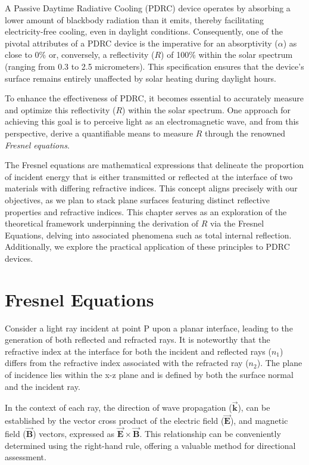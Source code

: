 A Passive Daytime Radiative Cooling (PDRC) device operates by absorbing a lower amount of blackbody radiation than it emits, thereby facilitating electricity-free cooling, even in daylight conditions. Consequently, one of the pivotal attributes of a PDRC device is the imperative for an absorptivity ($\alpha$) as close to 0\% or, conversely, a reflectivity ($R$) of 100\% within the solar spectrum (ranging from 0.3 to 2.5 micrometers). This specification ensures that the device's surface remains entirely unaffected by solar heating during daylight hours.

To enhance the effectiveness of PDRC, it becomes essential to accurately measure and optimize this reflectivity ($R$) within the solar spectrum. One approach for achieving this goal is to perceive light as an electromagnetic wave, and from this perspective, derive a quantifiable means to measure $R$ through the renowned \textit{Fresnel equations}.

The Fresnel equations are mathematical expressions that delineate the proportion of incident energy that is either transmitted or reflected at the interface of two materials with differing refractive indices. This concept aligns precisely with our objectives, as we plan to stack plane surfaces featuring distinct reflective properties and refractive indices. This chapter serves as an exploration of the theoretical framework underpinning the derivation of $R$ via the Fresnel Equations, delving into associated phenomena such as total internal reflection. Additionally, we explore the practical application of these principles to PDRC devices.


\section{Fresnel Equations}
Consider a light ray incident at point P upon a planar interface, leading to the generation of both reflected and refracted rays. It is noteworthy that the refractive index at the interface for both the incident and reflected rays ($n_1$) differs from the refractive index associated with the refracted ray ($n_2$). The plane of incidence lies within the x-z plane and is defined by both the surface normal and the incident ray.

In the context of each ray, the direction of wave propagation ($\vec{\mathbf{k}}$), can be established by the vector cross product of the electric field ($\vec{\mathbf{E}}$), and magnetic field ($\vec{\mathbf{B}}$) vectors, expressed as $\vec{\mathbf{E}} \times \vec{\mathbf{B}}$. This relationship can be conveniently determined using the right-hand rule, offering a valuable method for directional assessment.

